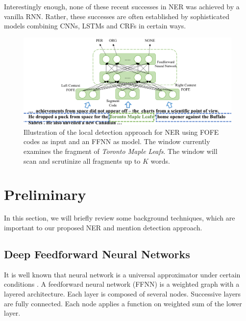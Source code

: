 \documentclass[11pt,a4paper]{article}
\begin{document}
Interestingly enough, none of these recent successes in NER was achieved by a vanilla RNN. Rather, 
these successes are often established by sophisticated models combining CNNs, LSTMs and CRFs in certain ways. 

\begin{figure}[t]
	\centering
	\includegraphics[width=0.9\linewidth]{figure-diagram-v2}
	\caption{Illustration of the local detection approach for NER using FOFE codes as input and an FFNN as model. The window currently examines the fragment of {\it Toronto Maple Leafs}. The window will scan and scrutinize all fragments up to $K$ words. }
	\label{Fig:FOFE-NER-diagram}
\end{figure}


\section{Preliminary}

In this section, we will briefly review some background techniques, which are important to our proposed NER and mention detection approach. 

\subsection{Deep Feedforward Neural Networks}

It is well known that  neural network is a universal approximator under certain conditions \cite{hornik1991approximation}.
A feedforward neural network (FFNN) is a weighted graph with a layered architecture.
Each layer is composed of several nodes.
Successive layers are fully connected. Each node applies a function on weighted sum of the lower layer.
\end{document}
